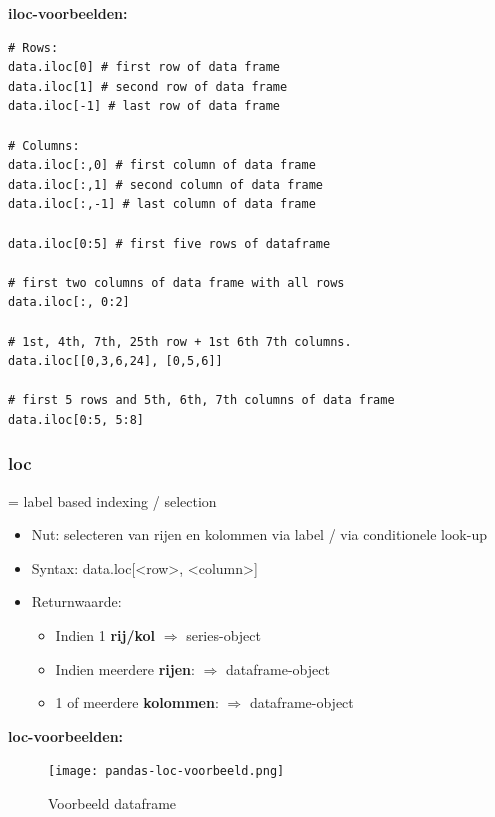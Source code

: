 \documentclass{article}
\begin{document}
\textbf{iloc-voorbeelden:}

\begin{verbatim}
# Rows:
data.iloc[0] # first row of data frame
data.iloc[1] # second row of data frame
data.iloc[-1] # last row of data frame

# Columns:
data.iloc[:,0] # first column of data frame
data.iloc[:,1] # second column of data frame
data.iloc[:,-1] # last column of data frame

data.iloc[0:5] # first five rows of dataframe

# first two columns of data frame with all rows
data.iloc[:, 0:2] 

# 1st, 4th, 7th, 25th row + 1st 6th 7th columns.
data.iloc[[0,3,6,24], [0,5,6]]  

# first 5 rows and 5th, 6th, 7th columns of data frame
data.iloc[0:5, 5:8]

\end{verbatim}

\subsubsection{loc}

= label based indexing / selection

\begin{itemize}
    \item Nut: selecteren van rijen en kolommen via label / via conditionele look-up
    \item Syntax: data.loc[<row>, <column>]
    \item Returnwaarde:
    \begin{itemize}
        \item Indien 1 \textbf{rij/kol} $\Rightarrow$ series-object
        \item Indien meerdere \textbf{rijen}: $\Rightarrow$ dataframe-object
        \item 1 of meerdere \textbf{kolommen}: $\Rightarrow$ dataframe-object 
    \end{itemize}
\end{itemize}


\textbf{loc-voorbeelden:}

\begin{figure}[H]
    \centering
    \texttt{[image: pandas-loc-voorbeeld.png]}
    \caption{Voorbeeld dataframe}
\end{figure}
\end{document}
